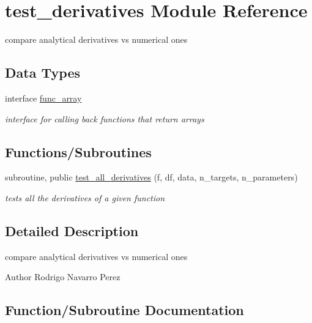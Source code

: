 \hypertarget{namespacetest__derivatives}{}\section{test\+\_\+derivatives Module Reference}
\label{namespacetest__derivatives}


compare analytical derivatives vs numerical ones  


\subsection*{Data Types}
\begin{DoxyCompactItemize}
\item 
interface \hyperlink{interfacetest__derivatives_1_1func__array}{func\+\_\+array}
\begin{DoxyCompactList}\small\item\em interface for calling back functions that return arrays \end{DoxyCompactList}\end{DoxyCompactItemize}
\subsection*{Functions/\+Subroutines}
\begin{DoxyCompactItemize}
\item 
subroutine, public \hyperlink{namespacetest__derivatives_a18e87b90fff445aa01dfe6a5ec160554}{test\+\_\+all\+\_\+derivatives} (f, df, data, n\+\_\+targets, n\+\_\+parameters)
\begin{DoxyCompactList}\small\item\em tests all the derivatives of a given function \end{DoxyCompactList}\end{DoxyCompactItemize}


\subsection{Detailed Description}
compare analytical derivatives vs numerical ones 

\begin{DoxyAuthor}{Author}
Rodrigo Navarro Perez 
\end{DoxyAuthor}


\subsection{Function/\+Subroutine Documentation}
\mbox{\label{namespacetest__derivatives_a18e87b90fff445aa01dfe6a5ec160554}} 
